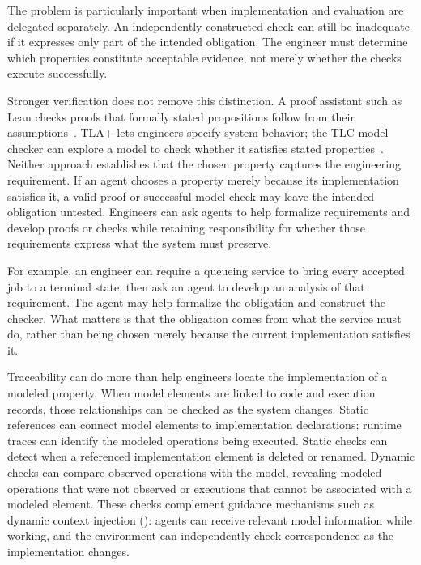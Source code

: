 The problem is particularly important when implementation and evaluation are delegated separately. An independently constructed check can still be inadequate if it expresses only part of the intended obligation. The engineer must determine which properties constitute acceptable evidence, not merely whether the checks execute successfully.


Stronger verification does not remove this distinction. A proof assistant such as Lean checks proofs that formally stated propositions follow from their assumptions~\citep{lean-reference}. TLA+ lets engineers specify system behavior; the TLC model checker can explore a model to check whether it satisfies stated properties~\citep{lamport2002}. Neither approach establishes that the chosen property captures the engineering requirement. If an agent chooses a property merely because its implementation satisfies it, a valid proof or successful model check may leave the intended obligation untested. Engineers can ask agents to help formalize requirements and develop proofs or checks while retaining responsibility for whether those requirements express what the system must preserve.


For example, an engineer can require a queueing service to bring every accepted job to a terminal state, then ask an agent to develop an analysis of that requirement. The agent may help formalize the obligation and construct the checker. What matters is that the obligation comes from what the service must do, rather than being chosen merely because the current implementation satisfies it.

Traceability can do more than help engineers locate the implementation of a modeled property. When model elements are linked to code and execution records, those relationships can be checked as the system changes. Static references can connect model elements to implementation declarations; runtime traces can identify the modeled operations being executed. Static checks can detect when a referenced implementation element is deleted or renamed. Dynamic checks can compare observed operations with the model, revealing modeled operations that were not observed or executions that cannot be associated with a modeled element. These checks complement guidance mechanisms such as dynamic context injection (): agents can receive relevant model information while working, and the environment can independently check correspondence as the implementation changes.

